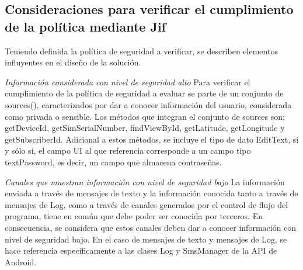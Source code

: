 \subsection{Consideraciones para verificar el cumplimiento de la política
mediante Jif} 
\label{subsec:consVerPol}
Teniendo definida la política de seguridad a verificar, se describen
elementos influyentes en el diseño de la solución.

\textit{Información considerada con nivel de seguridad alto}\newline
Para verificar el cumplimiento de la política de seguridad a evaluar se parte de
un conjunto de sources(), caracterizados por dar a conocer información del
usuario, considerada como privada o sensible. Los métodos que integran
el conjunto de sources son: getDeviceId, getSimSerialNumber, findViewById,
getLatitude, getLongitude y getSubscriberId. Adicional a estos métodos, se
incluye el tipo de dato EditText, si y sólo si, el campo UI al que referencia
corresponde a un campo tipo textPassword, es decir, un campo que almacena
contraseñas.\newline 

\textit{Canales que muestran información con nivel de seguridad bajo}\newline
La información enviada a través de mensajes de texto y la información conocida
tanto a través de mensajes de Log, como a través de canales generados por el
control de flujo del programa, tiene en común que debe poder ser conocida por
terceros. En consecuencia, se considera que estos canales deben dar a conocer
información con nivel de seguridad bajo.\newline
En el caso de mensajes de texto y mensajes de Log, se hace referencia
específicamente a las clases Log y SmsManager de la API de Android.

